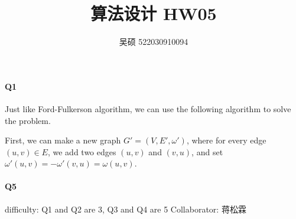 \documentclass[UTF8]{ctexart}
\renewcommand{\(}{\left(}
\renewcommand{\)}{\right)}
\begin{document}
\title{算法设计 HW05}  
\author{吴硕 522030910094}
\maketitle

\paragraph{Q1} 
Just like Ford-Fulkerson algorithm, we can use the following algorithm to solve the problem.

First, we can make a new graph $G' = (V, E', \omega ')$, where for every edge $(u,v) \in E$, we add two edges $(u,v)$ and $(v,u)$, and set $\omega '(u,v) = - \omega '(v,u) = \omega(u,v)$.




\paragraph{Q5}

difficulty: Q1 and Q2 are 3, Q3 and Q4 are 5
Collaborator: 蒋松霖
\end{document}

